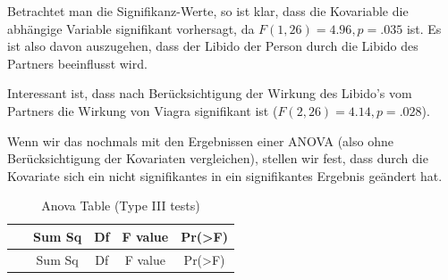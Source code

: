 \documentclass[]{article}
\begin{document}
Betrachtet man die Signifikanz-Werte, so ist klar, dass die Kovariable
die abhängige Variable signifikant vorhersagt, da
\(F(1,26) = 4.96, p = .035\) ist. Es ist also davon auszugehen, dass der
Libido der Person durch die Libido des Partners beeinflusst wird.

Interessant ist, dass nach Berücksichtigung der Wirkung des Libido's vom
Partners die Wirkung von Viagra signifikant ist
(\(F(2,26) = 4.14, p = .028\)).

Wenn wir das nochmals mit den Ergebnissen einer ANOVA (also ohne
Berücksichtigung der Kovariaten vergleichen), stellen wir fest, dass
durch die Kovariate sich ein nicht signifikantes in ein signifikantes
Ergebnis geändert hat.

\begin{longtable}[]{@{}ccccc@{}}
\caption{Anova Table (Type III tests)}\tabularnewline
\toprule
\begin{minipage}[b]{0.21\columnwidth}\centering\strut
~\strut
\end{minipage} & \begin{minipage}[b]{0.11\columnwidth}\centering\strut
Sum Sq\strut
\end{minipage} & \begin{minipage}[b]{0.06\columnwidth}\centering\strut
Df\strut
\end{minipage} & \begin{minipage}[b]{0.12\columnwidth}\centering\strut
F value\strut
\end{minipage} & \begin{minipage}[b]{0.13\columnwidth}\centering\strut
Pr(\textgreater{}F)\strut
\end{minipage}\tabularnewline
\midrule
\endfirsthead
\toprule
\begin{minipage}[b]{0.21\columnwidth}\centering\strut
~\strut
\end{minipage} & \begin{minipage}[b]{0.11\columnwidth}\centering\strut
Sum Sq\strut
\end{minipage} & \begin{minipage}[b]{0.06\columnwidth}\centering\strut
Df\strut
\end{minipage} & \begin{minipage}[b]{0.12\columnwidth}\centering\strut
F value\strut
\end{minipage} & \begin{minipage}[b]{0.13\columnwidth}\centering\strut
Pr(\textgreater{}F)\strut
\end{minipage}\tabularnewline

\end{longtable}
\end{document}
